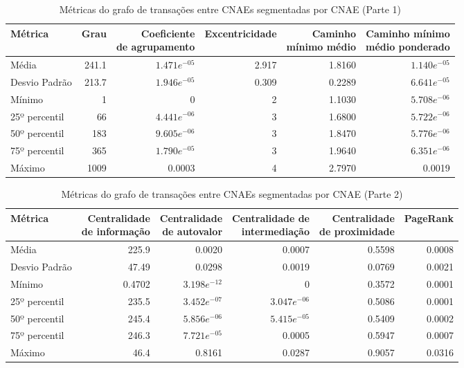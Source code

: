 \begin{table}[htb]
\centering
\caption{Métricas do grafo de transações entre CNAEs segmentadas por CNAE (Parte 1)}
\label{tab:metricas-redes:grafo-por-cnae-especificas1}
\begin{tabular}{l|rrrrr}
\toprule
Métrica & Grau & \shortstack{Coeficiente\\de agrupamento} & Excentricidade & \shortstack{Caminho\\mínimo médio} & \shortstack{Caminho mínimo\\médio ponderado} \\
\midrule
Média         &  241.1 &   $1.471e^{-05}$ & 2.917 & 1.8160 & $1.140e^{-05}$ \\
Desvio Padrão &  213.7 &   $1.946e^{-05}$ & 0.309 & 0.2289 & $6.641e^{-05}$ \\
Mínimo        &    1   &                0 &     2 & 1.1030 & $5.708e^{-06}$ \\
25º percentil &   66   &   $4.441e^{-06}$ &     3 & 1.6800 & $5.722e^{-06}$ \\
50º percentil &  183   &   $9.605e^{-06}$ &     3 & 1.8470 & $5.776e^{-06}$ \\
75º percentil &  365   &   $1.790e^{-05}$ &     3 & 1.9640 & $6.351e^{-06}$ \\
Máximo        & 1009   &           0.0003 &     4 & 2.7970 &         0.0019 \\
\bottomrule
\end{tabular}
\fdadospesquisa
\end{table}

\begin{table}[htb]
\centering
\caption{Métricas do grafo de transações entre CNAEs segmentadas por CNAE (Parte 2)}
\label{tab:metricas-redes:grafo-por-cnae-especificas2}
\begin{tabular}{l|rrrrr}
\toprule
Métrica & \shortstack{Centralidade\\de informação} & \shortstack{Centralidade\\de autovalor} & \shortstack{Centralidade de\\intermediação} & \shortstack{Centralidade\\de proximidade} & PageRank \\
\midrule
Média         & 225.9    &         0.0020 &         0.0007 & 0.5598 & 0.0008 \\
Desvio Padrão &  47.49   &         0.0298 &         0.0019 & 0.0769 & 0.0021 \\
Mínimo        &   0.4702 & $3.198e^{-12}$ &              0 & 0.3572 & 0.0001 \\
25º percentil & 235.5    & $3.452e^{-07}$ & $3.047e^{-06}$ & 0.5086 & 0.0001 \\
50º percentil & 245.4    & $5.856e^{-06}$ & $5.415e^{-05}$ & 0.5409 & 0.0002 \\
75º percentil & 246.3    & $7.721e^{-05}$ &         0.0005 & 0.5947 & 0.0007 \\
Máximo        & 46.4     &         0.8161 &         0.0287 & 0.9057 & 0.0316 \\
\bottomrule
\end{tabular}
\fdadospesquisa
\end{table}

